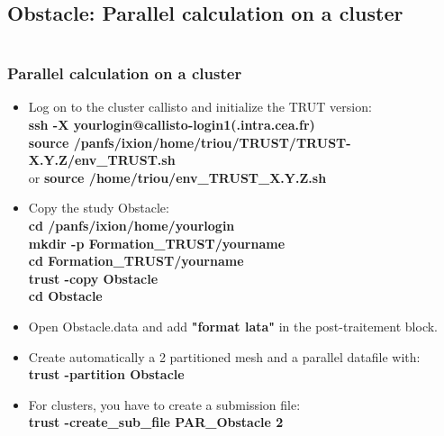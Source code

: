 \documentclass[10pt, hyperref={unicode=true,pdfusetitle, bookmarks=true,bookmarksnumbered=false,bookmarksopen=false, breaklinks=false,pdfborder={0 0 1},backref=true,colorlinks=true,linkcolor=darkblue,pageanchor}]{beamer}
\begin{document}
\subsection{Obstacle: Parallel calculation on a cluster} \label{exo_para_3}
\begin{frame}
\begin{columns}[c] 
\tableofcontents[sections={1-9},currentsection, currentsubsection]
\tableofcontents[sections={10-16},currentsection, currentsubsection]
\end{columns}
\end{frame}
\begin{frame}
\frametitle{Parallel calculation on a cluster}
\begin{block}{}

\begin{itemize}
\item Log on to the cluster callisto and initialize the TRUT version: \\
{\small{
\textbf{ssh -X yourlogin@callisto-login1(.intra.cea.fr)} \\
\textbf{source /panfs/ixion/home/triou/TRUST/TRUST-X.Y.Z/env\_TRUST.sh}\\
or 
\textbf{source /home/triou/env\_TRUST\_X.Y.Z.sh}\\
}}

\item Copy the study Obstacle:\\
\textbf{cd /panfs/ixion/home/yourlogin}\\
\textbf{mkdir  -p  Formation\_TRUST/yourname} \\
\textbf{cd Formation\_TRUST/yourname} \\
\textbf{trust -copy Obstacle} \\
\textbf{cd Obstacle} \\

\item Open Obstacle.data and add \textbf{"format lata"} in the post-traitement block.

\item Create automatically a 2 partitioned mesh and a parallel datafile with:\\
\textbf{trust -partition Obstacle}

\item For clusters, you have to create a submission file:\\
\textbf{trust -create\_sub\_file PAR\_Obstacle 2}
\end{itemize}

\end{block}
\end{frame}
\end{document}
